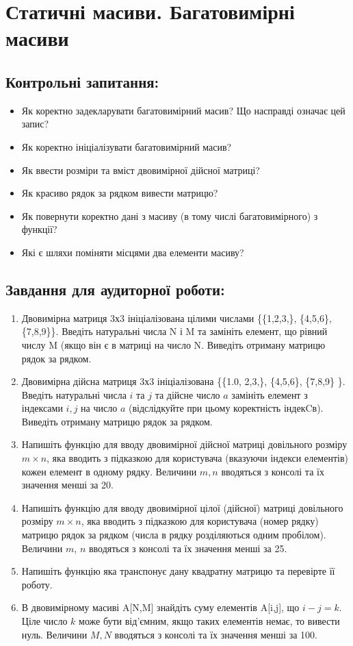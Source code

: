 \documentclass[a5paper,titlepage,openany,twoside,draft]{book_unv}%
\begin{document}
\chapter{ Статичні масиви. Багатовимірні масиви }
%

\section{Контрольні запитання:}
\begin{itemize}
\item
Як коректно задекларувати багатовимірний масив?
Що насправді означає цей запис?
\item
Як коректно ініціалізувати багатовимірний масив?
\item
  Як ввести розміри та вміст двовимірної
  дійсної матриці?
\item
 Як красиво рядок за рядком вивести матрицю?
\item
  Як повернути коректно дані з масиву 
(в тому числі багатовимірного) з функції?
\item
Які є шляхи поміняти місцями два елементи масиву? 
\end{itemize}

\section{Завдання для аудиторної роботи:}

\begin{enumerate}
\def\labelenumi{\arabic{enumi})}
\item
  Двовимірна матриця 3х3 ініціалізована цілими числами
  \{\{1,2,3,\}, \{4,5,6\}, \{7,8,9\}\}. Введіть
  натуральні числа N і M та замініть елемент, що рівний числу M (якщо
  він є в матриці на число N. Виведіть отриману матрицю рядок за
  рядком.
\item
  Двовимірна дійсна матриця 3х3 ініціалізована \{\{1.0,
  2,3,\}, \{4,5,6\}, \{7,8,9\} \}. Введіть
  натуральні числа $i$ та $j$ та дійсне число $a$ замініть елемент з індексами
  $i,j$ на число $a$ (відслідкуйте при цьому коректність індекCв). Виведіть
  отриману матрицю рядок за рядком.
\item
  Напишіть функцію для вводу двовимірної дійсної матриці довільного
  розміру $m \times n$, яка вводить з підказкою для користувача (вказуючи
  індекси елементів) кожен елемент в одному рядку. Величини $m, n$
  вводяться з консолі та їх значення менші за 20.
\item
  Напишіть функцію для вводу двовимірної цілої (дійсної) матриці
  довільного розміру $m \times n$, яка вводить з підказкою для користувача
  (номер рядку) матрицю рядок за рядком (числа в рядку розділяються
  одним пробілом). Величини $m$, $n$ вводяться з консолі та їх значення
  менші за 25.
\item
 Напишіть функцію яка транспонує дану квадратну матрицю та перевірте її
роботу.
\item
  В двовимірному масиві A{[}N,M{]} знайдіть суму елементів A{[}i,j{]},
  що $i-j=k$. Ціле число $k$ може бути від'ємним, якщо таких елементів
  немає, то вивести нуль. Величини $M, N$ вводяться з консолі та їх
  значення менші за 100.
\end{enumerate}
\end{document}
